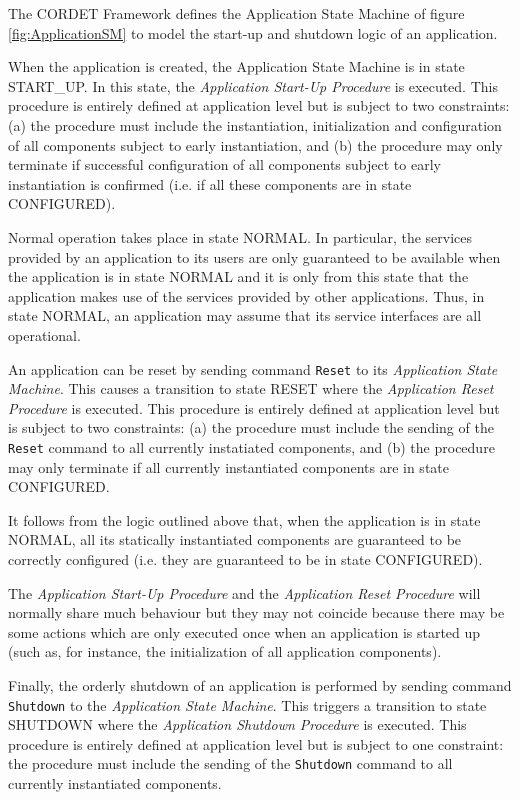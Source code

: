 The CORDET Framework defines the Application State Machine of figure \ref{fig:ApplicationSM} to model the start-up and shutdown logic of an application. 

When the application is created, the Application State Machine is in state START\_UP. 
In this state, the \textit{Application Start-Up Procedure} is executed. 
This procedure is entirely defined at application level but is subject to two constraints: (a) the procedure must include the instantiation, initialization and configuration of all components subject to early instantiation, and (b) the procedure may only terminate if successful configuration of all components subject to early instantiation is confirmed (i.e. if all these components are in state CONFIGURED). 

Normal operation takes place in state NORMAL. 
In particular, the services provided by an application to its users are only guaranteed to be available when the application is in state NORMAL and it is only from this state that the application makes use of the services provided by other applications. 
Thus, in state NORMAL, an application may assume that its service interfaces are all operational.

An application can be reset by sending command \texttt{Reset} to its \textit{Application State Machine}. This causes a transition to state RESET where the \textit{Application Reset Procedure} is executed. This procedure is entirely defined at application level but is subject to two constraints: (a) the procedure must include the sending of the \texttt{Reset} command to all currently instatiated components, and (b) the procedure may only terminate if all currently instantiated components are in state CONFIGURED.

It follows from the logic outlined above that, when the application is in state NORMAL, all its statically instantiated components are guaranteed to be correctly configured (i.e. they are guaranteed to be in state CONFIGURED).

The \textit{Application Start-Up Procedure} and the \textit{Application Reset Procedure} will normally share much behaviour but they may not coincide because there may be some actions which are only executed once when an application is started up (such as, for instance, the initialization of all application components).

Finally, the orderly shutdown of an application is performed by sending command \texttt{Shutdown} to the \textit{Application State Machine}. This triggers a transition to state SHUTDOWN where the \textit{Application Shutdown Procedure} is executed. This procedure is entirely defined at application level but is subject to one constraint: the procedure must include the sending of the \texttt{Shutdown} command to all currently instantiated components. 

